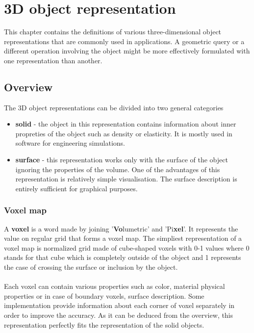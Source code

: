 \chapter{3D object representation}

This chapter contains the definitions of various three-dimensional object representations
that are commonly used in applications. A geometric query or a different operation involving the
object might be more effectively formulated with one representation than another.

\section{Overview}

The 3D object representations can be divided into two general categories

\begin{itemize}
\item \textbf{solid} - the object in this representation contains information about inner
propreties of the object such as density or elasticity. It is mostly used in software for
engineering simulations.

\item \textbf{surface} - this representation works only with the surface of the object
ignoring the properties of the volume. One of the advantages of this representation is
relatively simple visualisation. The surface description is entirely sufficient for graphical purposes.
\end{itemize}

\subsection{Voxel map}

A \textbf{voxel} is a word made by joining '\textbf{Vo}lumetric' and 'Pi\textbf{xel}'. It represents
the value on regular grid that forms a voxel map. The simpliest representation of a voxel map is
normalized grid made of cube-shaped voxels with 0-1 values where 0 stands for that cube which is completely
outside of the object and 1 represents the case of crossing the surface or inclusion by the object.
\\
\\
Each voxel can contain various properties such as color, material physical properties or
in case of boundary voxels, surface description. Some implementation provide information about
each corner of voxel separately in order to improve the accuracy.
As it can be deduced from the overview, this representation perfectly fits the representation
of the solid objects.

